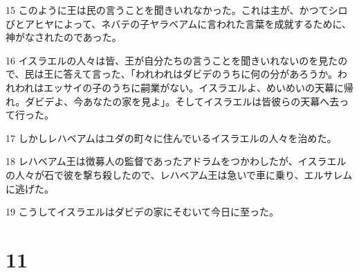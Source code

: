 \par 15 このように王は民の言うことを聞きいれなかった。これは主が、かつてシロびとアヒヤによって、ネバテの子ヤラベアムに言われた言葉を成就するために、神がなされたのであった。
\par 16 イスラエルの人々は皆、王が自分たちの言うことを聞きいれないのを見たので、民は王に答えて言った、「われわれはダビデのうちに何の分があろうか。われわれはエッサイの子のうちに嗣業がない。イスラエルよ、めいめいの天幕に帰れ。ダビデよ、今あなたの家を見よ」。そしてイスラエルは皆彼らの天幕へ去って行った。
\par 17 しかしレハベアムはユダの町々に住んでいるイスラエルの人々を治めた。
\par 18 レハベアム王は徴募人の監督であったアドラムをつかわしたが、イスラエルの人々が石で彼を撃ち殺したので、レハベアム王は急いで車に乗り、エルサレムに逃げた。
\par 19 こうしてイスラエルはダビデの家にそむいて今日に至った。

\chapter{11}

